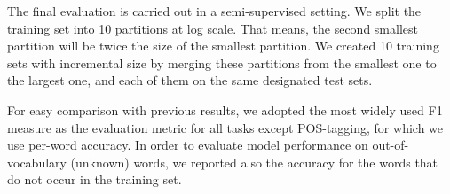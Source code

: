 The final evaluation is carried out in a semi-supervised setting. We split the training set into 10 partitions at log scale. That means, the second smallest partition will be twice the size of the smallest partition. We created 10 training sets with incremental size by merging these partitions from the smallest one to the largest one, and each of them on the same designated test sets. 

For easy comparison with previous results, we adopted the most widely used F1 measure as the evaluation metric for all tasks except POS-tagging, for which we use per-word accuracy. In order to evaluate model performance on out-of-vocabulary (unknown) words, we reported also the accuracy for the words that do not occur in the training set.




